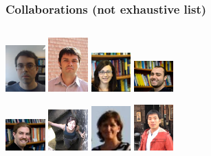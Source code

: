 \documentclass{beamer}
\begin{document}
\begin{frame}
  \frametitle{Collaborations (not exhaustive list)}
  \begin{columns}[t]
      \begin{center}
        \includegraphics[width=0.6in]{figures/boris}
        \includegraphics[width=0.6in]{figures/alex}
        \includegraphics[width=0.6in]{figures/cristina}
        \includegraphics[width=0.6in]{figures/alessandro}
        
        \includegraphics[width=0.6in]{figures/ken}
        \includegraphics[width=0.6in]{figures/azadeh}
        \includegraphics[width=0.6in]{figures/nuria}
        \includegraphics[width=0.6in]{figures/ray}
        

\end{center}
\end{columns}
\end{frame}
\end{document}
